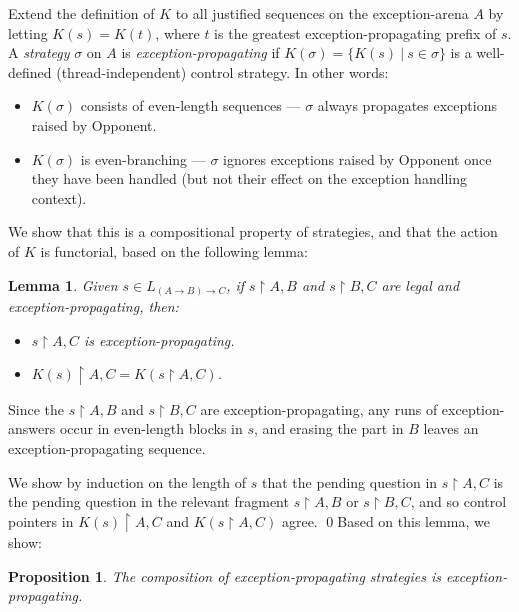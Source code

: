 \documentclass{eptcs}
\def\restrict{\!\! \upharpoonright \!\!}
\def\restrict{\!\! \upharpoonright \!\!}
\newtheorem{lemma}[theorem]{Lemma}
\newtheorem{proposition}[theorem]{Proposition}
\newif\ifqed
\newcommand{\qed}{\global\qedfalse\noindent\unskip\penalty50\null\nobreak\hskip1em\nobreak\hfill$\Box$}
\let\Box\undefined
\newenvironment{proof}[1][Proof]{\global\qedtrue\trivlist\item[\hskip\labelsep\textsc{#1:}]}{\ifqed\qed\fi\endtrivlist}
\begin{document}
{Extend the definition of $K$ to all justified sequences on the exception-arena  $A$ by letting $K(s) = K(t)$, where $t$ is the greatest exception-propagating prefix of $s$. A \emph{strategy} $\sigma$ on $A$ is \emph{exception-propagating} if $K(\sigma) = \{K(s)\ |\ s\in \sigma\}$ is a well-defined (thread-independent) control strategy. In other words:
\begin{itemize}
\item $K(\sigma)$ consists of even-length sequences --- $\sigma$ always propagates exceptions raised by Opponent. 
\item $K(\sigma)$ is even-branching --- $\sigma$ ignores exceptions raised by Opponent once they have been handled (but not their effect on the exception handling context). 
\end{itemize}  
We show that this is a compositional property of strategies, and that the action of $K$ is functorial, based on the following lemma:
\begin{lemma}Given  $s \in L_{(A \rightarrow B) \rightarrow C}$, if $s \restrict A,B$ and $s \restrict B,C$ are legal and exception-propagating, then:
\begin{itemize}
\item  $s \restrict A,C$ is exception-propagating. 
\item $K(s)\restrict A,C = K(s \restrict A,C)$.  
\end{itemize}
\end{lemma}
\begin{proof}Since the $s \restrict A,B$ and $s \restrict B,C$ are exception-propagating, any runs of exception-answers occur in even-length blocks in $s$, and erasing the part in $B$ leaves an exception-propagating sequence.

We show by induction on the length of $s$ that the pending question in $s \restrict A,C$ is the pending question in the relevant fragment $s \restrict A,B$ or $s\restrict B,C$, and so control pointers in $K(s)\restrict A,C$ and  $K(s \restrict A,C)$ agree.  
\end{proof}Based on this lemma, we show:
\begin{proposition}The composition of exception-propagating strategies is exception-propagating. 
\end{proposition}

}
\end{document}
